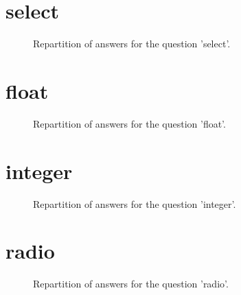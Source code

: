 \documentclass[12pt]{article}
\begin{document}
\clearpage{}
\section{select}

\label{sec:17}


\begin{figure}[h!]
    \caption{\label{figure:q17-1}Repartition of answers for the question 'select'.}
\end{figure}



\clearpage{}
\section{float}

\label{sec:20}


\begin{figure}[h!]
    \caption{\label{figure:q20-1}Repartition of answers for the question 'float'.}
\end{figure}



\clearpage{}
\section{integer}

\label{sec:19}


\begin{figure}[h!]
    \caption{\label{figure:q19-1}Repartition of answers for the question 'integer'.}
\end{figure}



\clearpage{}
\section{radio}

\label{sec:22}


\begin{figure}[h!]
    \caption{\label{figure:q22-1}Repartition of answers for the question 'radio'.}
\end{figure}
\end{document}
